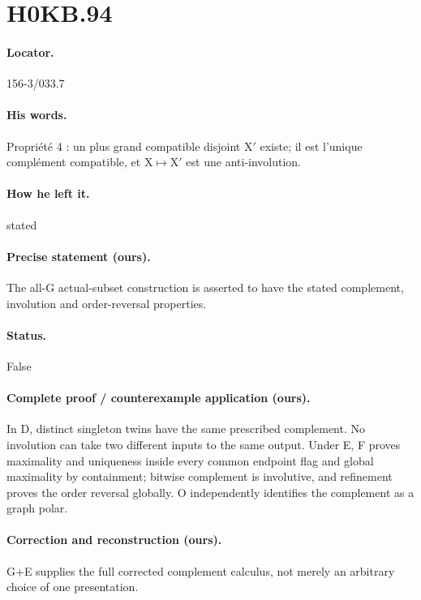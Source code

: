 \section*{H0KB.94}\label{statement:H0KB.94}
\paragraph{Locator.} 156-3/033.7

\paragraph{His words.} Propriété 4 : un plus grand compatible disjoint X\ensuremath{\prime} existe; il est l’unique complément compatible, et X\ensuremath{\mapsto}X\ensuremath{\prime} est une anti-involution.

\paragraph{How he left it.} stated

\paragraph{Precise statement (ours).} The all-G actual-subset construction is asserted to have the stated complement, involution and order-reversal properties.

\paragraph{Status.} False

\paragraph{Complete proof / counterexample application (ours).} In D, distinct singleton twins have the same prescribed complement. No involution can take two different inputs to the same output. Under E, F proves maximality and uniqueness inside every common endpoint flag and global maximality by containment; bitwise complement is involutive, and refinement proves the order reversal globally. O independently identifies the complement as a graph polar.

\paragraph{Correction and reconstruction (ours).} G+E supplies the full corrected complement calculus, not merely an arbitrary choice of one presentation.

